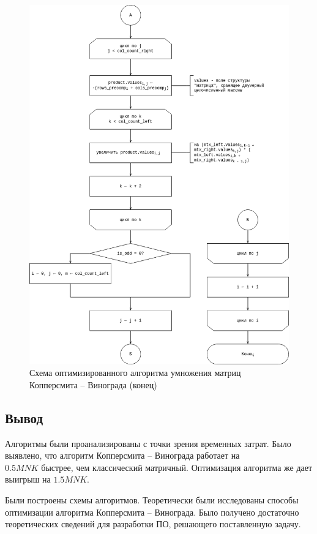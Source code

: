 \begin{figure}[H]
	\centering
	\includegraphics[width=0.9\linewidth]{assets/mtx-win-o-2.drawio.png}
	\caption{Схема оптимизированного алгоритма умножения матриц Копперсмита -- Винограда (конец)}
	\label{fig:win-o-2}
\end{figure}

\subsection{Вывод}
Алгоритмы были проанализированы с точки зрения временных затрат. Было выявлено, что алгоритм Копперсмита -- Винограда работает на \\ $0.5MNK$ быстрее, чем классический матричный. Оптимизация алгоритма же дает выигрыш на $1.5MNK$. 


Были построены схемы алгоритмов. Теоретически были исследованы способы оптимизации алгоритма Копперсмита -- Винограда. Было получено достаточно теоретических сведений для разработки ПО, решающего поставленную задачу.